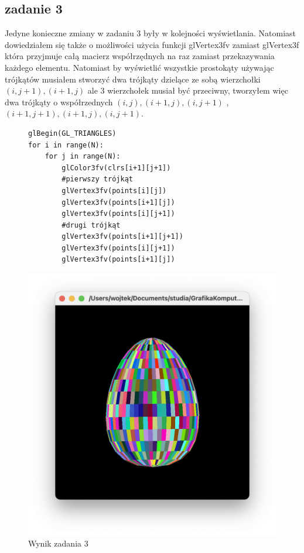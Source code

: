 \documentclass[]{article}
\begin{document}
\subsection{zadanie 3}
Jedyne konieczne zmiany w zadaniu 3 były w kolejności wyświetlania. Natomiast dowiedziałem się także o możliwości użycia funkcji glVertex3fv zamiast glVertex3f która przyjmuje całą macierz współrzędnych na raz zamiast przekazywania każdego elementu. Natomiast by wyświetlić wszystkie prostokąty używając trójkątów musiałem stworzyć dwa trójkąty dzielące ze sobą wierzchołki $(i,j+1),(i+1,j)$ ale 3 wierzchołek musiał być przeciwny, tworzyłem więc dwa trójkąty o współrzednych $(i,j),(i+1,j),(i,j+1)$ , $(i+1,j+1),(i+1,j),(i,j+1)$.
\begin{figure}[H]
	\begin{verbatim}
glBegin(GL_TRIANGLES)
for i in range(N):
	for j in range(N):
		glColor3fv(clrs[i+1][j+1])
		#pierwszy trójkąt
		glVertex3fv(points[i][j])
		glVertex3fv(points[i+1][j])
		glVertex3fv(points[i][j+1])
		#drugi trójkąt
		glVertex3fv(points[i+1][j+1])
		glVertex3fv(points[i][j+1])
		glVertex3fv(points[i+1][j])
	\end{verbatim}
\end{figure}
\begin{figure}[H]
	\centering
	\includegraphics[width=\textwidth]{zad3.png}
	\caption{Wynik zadania 3}
\end{figure}
\end{document}
